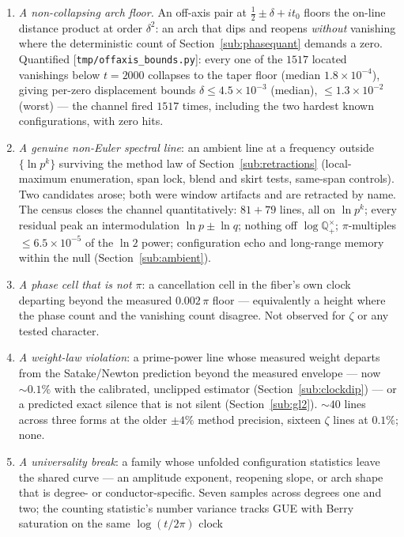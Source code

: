 \documentclass[11pt]{article}
\newcommand{\code}[1]{\texttt{#1}}
\begin{document}
\begin{enumerate}[label=\textup{(F\arabic*)}]
\item \emph{A non-collapsing arch floor.}  An off-axis pair at $\tfrac12\pm\delta+it_0$
floors the on-line distance product at order $\delta^{2}$: an arch that dips and reopens
\emph{without} vanishing where the deterministic count of Section~\ref{sub:phasequant}
demands a zero.  Quantified [\code{tmp/offaxis\_bounds.py}]: every one of the $1517$ located
vanishings below $t=2000$ collapses to the taper floor (median $1.8\times10^{-4}$), giving
per-zero displacement bounds $\delta\le4.5\times10^{-3}$ (median), $\le1.3\times10^{-2}$
(worst) --- the channel fired $1517$ times, including the two hardest known configurations,
with zero hits.
\item \emph{A genuine non-Euler spectral line}: an ambient line at a frequency outside
$\{\ln p^{k}\}$ surviving the method law of Section~\ref{sub:retractions} (local-maximum
enumeration, span lock, blend and skirt tests, same-span controls).  Two candidates arose;
both were window artifacts and are retracted by name.  The census closes the channel
quantitatively: $81+79$ lines, all on $\ln p^{k}$; every residual peak an intermodulation
$\ln p\pm\ln q$; nothing off $\log\mathbb{Q}_{+}^{\times}$; $\pi$-multiples
$\le6.5\times10^{-5}$ of the $\ln2$ power; configuration echo and long-range memory within
the null (Section~\ref{sub:ambient}).
\item \emph{A phase cell that is not $\pi$}: a cancellation cell in the fiber's own clock
departing beyond the measured $0.002\,\pi$ floor --- equivalently a height where the phase
count and the vanishing count disagree.  Not observed for $\zeta$ or any tested character.
\item \emph{A weight-law violation}: a prime-power line whose measured weight departs from
the Satake/Newton prediction beyond the measured envelope --- now ${\sim}0.1\%$ with the
calibrated, unclipped estimator (Section~\ref{sub:clockdip}) --- or a predicted exact
silence that is not silent (Section~\ref{sub:gl2}).  ${\sim}40$ lines across three forms at
the older $\pm4\%$ method precision, sixteen $\zeta$ lines at $0.1\%$; none.
\item \emph{A universality break}: a family whose unfolded configuration statistics leave
the shared curve --- an amplitude exponent, reopening slope, or arch shape that is degree- or
conductor-specific.  Seven samples across degrees one and two; the counting statistic's
number variance tracks GUE with Berry saturation on the same $\log(t/2\pi)$ clock

\end{enumerate}
\end{document}
